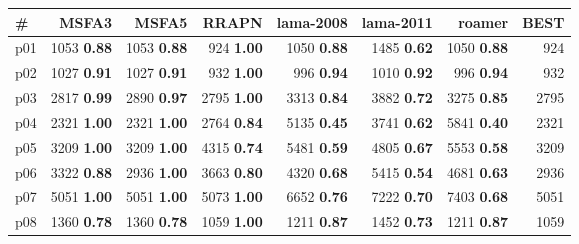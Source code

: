 \begin{tabular}{lrrrrrrr}
\toprule
\textbf{\#} & \textbf{MSFA3} & \textbf{MSFA5} & \textbf{RRAPN} & \textbf{lama-2008} & \textbf{lama-2011} & \textbf{roamer} & \textbf{BEST}\\
\midrule
\multicolumn{1}{l|}{p01} & {\footnotesize 1053} \textbf{0.88} & {\footnotesize 1053} \textbf{0.88} & {\footnotesize 924} \textbf{1.00} & {\footnotesize 1050} \textbf{0.88} & {\footnotesize 1485} \textbf{0.62} & {\footnotesize 1050} \textbf{0.88} & \multicolumn{1}{|r}{924}\\
\multicolumn{1}{l|}{p02} & {\footnotesize 1027} \textbf{0.91} & {\footnotesize 1027} \textbf{0.91} & {\footnotesize 932} \textbf{1.00} & {\footnotesize 996} \textbf{0.94} & {\footnotesize 1010} \textbf{0.92} & {\footnotesize 996} \textbf{0.94} & \multicolumn{1}{|r}{932}\\
\multicolumn{1}{l|}{p03} & {\footnotesize 2817} \textbf{0.99} & {\footnotesize 2890} \textbf{0.97} & {\footnotesize 2795} \textbf{1.00} & {\footnotesize 3313} \textbf{0.84} & {\footnotesize 3882} \textbf{0.72} & {\footnotesize 3275} \textbf{0.85} & \multicolumn{1}{|r}{2795}\\
\multicolumn{1}{l|}{p04} & {\footnotesize 2321} \textbf{1.00} & {\footnotesize 2321} \textbf{1.00} & {\footnotesize 2764} \textbf{0.84} & {\footnotesize 5135} \textbf{0.45} & {\footnotesize 3741} \textbf{0.62} & {\footnotesize 5841} \textbf{0.40} & \multicolumn{1}{|r}{2321}\\
\multicolumn{1}{l|}{p05} & {\footnotesize 3209} \textbf{1.00} & {\footnotesize 3209} \textbf{1.00} & {\footnotesize 4315} \textbf{0.74} & {\footnotesize 5481} \textbf{0.59} & {\footnotesize 4805} \textbf{0.67} & {\footnotesize 5553} \textbf{0.58} & \multicolumn{1}{|r}{3209}\\
\multicolumn{1}{l|}{p06} & {\footnotesize 3322} \textbf{0.88} & {\footnotesize 2936} \textbf{1.00} & {\footnotesize 3663} \textbf{0.80} & {\footnotesize 4320} \textbf{0.68} & {\footnotesize 5415} \textbf{0.54} & {\footnotesize 4681} \textbf{0.63} & \multicolumn{1}{|r}{2936}\\
\multicolumn{1}{l|}{p07} & {\footnotesize 5051} \textbf{1.00} & {\footnotesize 5051} \textbf{1.00} & {\footnotesize 5073} \textbf{1.00} & {\footnotesize 6652} \textbf{0.76} & {\footnotesize 7222} \textbf{0.70} & {\footnotesize 7403} \textbf{0.68} & \multicolumn{1}{|r}{5051}\\
\multicolumn{1}{l|}{p08} & {\footnotesize 1360} \textbf{0.78} & {\footnotesize 1360} \textbf{0.78} & {\footnotesize 1059} \textbf{1.00} & {\footnotesize 1211} \textbf{0.87} & {\footnotesize 1452} \textbf{0.73} & {\footnotesize 1211} \textbf{0.87} & \multicolumn{1}{|r}{1059}\\

\end{tabular}
